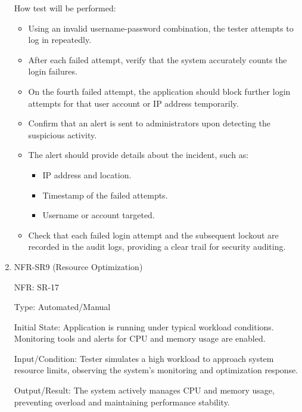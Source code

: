 \documentclass[12pt, titlepage]{article}
\begin{document}
\begin{enumerate}
  How test will be performed: 
  \begin{itemize}
    \item Using an invalid username-password combination, the tester attempts to log in
    repeatedly.
    \item After each failed attempt, verify that the system accurately counts the login failures.
    \item On the fourth failed attempt, the application should block further login attempts for
    that user account or IP address temporarily.
    \item  Confirm that an alert is sent to administrators upon detecting the suspicious activity.
    \item The alert should provide details about the incident, such as:
    \begin{itemize}
      \item IP address and location.
      \item Timestamp of the failed attempts.
      \item Username or account targeted.
    \end{itemize}
    \item Check that each failed login attempt and the subsequent lockout are recorded in the
    audit logs, providing a clear trail for security auditing.
  \end{itemize}

\item{NFR-SR9 (Resource Optimization)\\}
  
  NFR: SR-17
  
  Type: Automated/Manual
  
  Initial State: Application is running under typical workload conditions. Monitoring tools
  and alerts for CPU and memory usage are enabled.
  
  Input/Condition: Tester simulates a high workload to approach system resource limits,
  observing the system's monitoring and optimization response.
  
  Output/Result: The system actively manages CPU and memory usage, preventing overload and
  maintaining performance stability.


\end{enumerate}
\end{document}
